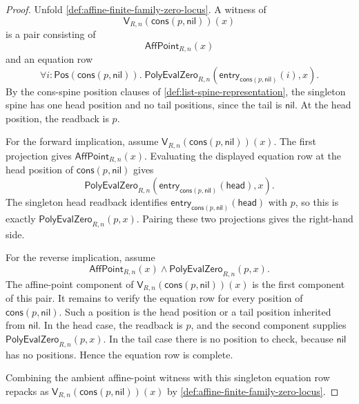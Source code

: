 \begin{proof}
Unfold \autoref{def:affine-finite-family-zero-locus}. A witness of
$$
\mathsf{V}_{R,n}(\mathsf{cons}(p,\mathsf{nil}))(x)
$$
is a pair consisting of
$$
\mathsf{AffPoint}_{R,n}(x)
$$
and an equation row
$$
\forall i:\mathsf{Pos}(\mathsf{cons}(p,\mathsf{nil})).\;
\mathsf{PolyEvalZero}_{R,n}(\mathsf{entry}_{\mathsf{cons}(p,\mathsf{nil})}(i),x).
$$
By the cons-spine position clauses of \autoref{def:list-spine-representation}, the singleton spine has one head position and no tail positions, since the tail is $\mathsf{nil}$. At the head position, the readback is $p$.

For the forward implication, assume $\mathsf{V}_{R,n}(\mathsf{cons}(p,\mathsf{nil}))(x)$. The first projection gives $\mathsf{AffPoint}_{R,n}(x)$. Evaluating the displayed equation row at the head position of $\mathsf{cons}(p,\mathsf{nil})$ gives
$$
\mathsf{PolyEvalZero}_{R,n}(\mathsf{entry}_{\mathsf{cons}(p,\mathsf{nil})}(\mathsf{head}),x).
$$
The singleton head readback identifies $\mathsf{entry}_{\mathsf{cons}(p,\mathsf{nil})}(\mathsf{head})$ with $p$, so this is exactly $\mathsf{PolyEvalZero}_{R,n}(p,x)$. Pairing these two projections gives the right-hand side.

For the reverse implication, assume
$$
\mathsf{AffPoint}_{R,n}(x)\land
\mathsf{PolyEvalZero}_{R,n}(p,x).
$$
The affine-point component of $\mathsf{V}_{R,n}(\mathsf{cons}(p,\mathsf{nil}))(x)$ is the first component of this pair. It remains to verify the equation row for every position of $\mathsf{cons}(p,\mathsf{nil})$. Such a position is the head position or a tail position inherited from $\mathsf{nil}$. In the head case, the readback is $p$, and the second component supplies $\mathsf{PolyEvalZero}_{R,n}(p,x)$. In the tail case there is no position to check, because $\mathsf{nil}$ has no positions. Hence the equation row is complete.

Combining the ambient affine-point witness with this singleton equation row repacks as $\mathsf{V}_{R,n}(\mathsf{cons}(p,\mathsf{nil}))(x)$ by \autoref{def:affine-finite-family-zero-locus}.
\end{proof}

